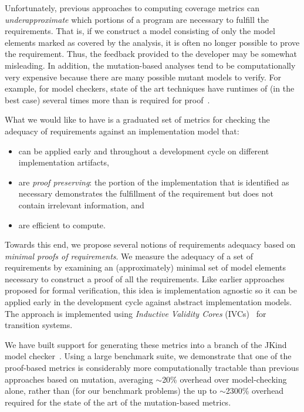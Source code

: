 Unfortunately, previous approaches to computing coverage metrics can {\em underapproximate} which portions of a program are necessary to fulfill the requirements.  That is, if we construct a model consisting of only the model elements marked as covered by the analysis, it is often no longer possible to prove the requirement.  Thus, the feedback provided to the developer may be somewhat misleading.
In addition, the mutation-based analyses tend to be computationally very expensive because there are many possible mutant models to verify.  For example, for model checkers, state of the art techniques have runtimes of (in the best case) several times more than is required for proof~\cite{chockler2010coverage}.

What we would like to have is a graduated set of metrics for checking the adequacy of requirements against an implementation model that:
\begin{itemize}
    \item can be applied early and throughout a development cycle on different implementation artifacts,
    \item are {\em proof preserving}: the portion of the implementation that is identified as necessary demonstrates the
        fulfillment of the requirement but does not contain irrelevant information, and
    \item are efficient to compute.
\end{itemize}

\noindent Towards this end, we propose several notions of requirements adequacy based on {\em minimal proofs of requirements}.  We measure the adequacy of a set of requirements by examining an (approximately) minimal set of model elements necessary to construct a proof of all the requirements.  Like earlier approaches proposed for formal verification, this idea is implementation agnostic so it can be applied early in the development cycle against abstract implementation models.  The approach is implemented using {\em Inductive Validity Cores} (IVCs)~\cite{Ghass16} for transition systems.

We have built support for generating these metrics into a branch of the JKind model checker~\cite{jkind}.  Using a large benchmark suite, we demonstrate that one of the proof-based metrics is considerably more computationally tractable than previous approaches based on mutation, averaging ${\sim}$20\% overhead over model-checking alone, rather than (for our benchmark problems) the up to ${\sim}$2300\% overhead required for the state of the art of the mutation-based metrics.

